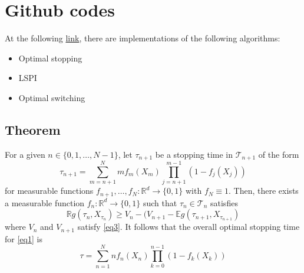 \documentclass{article}
\begin{document}
\section{Github codes}
At the following \href{https://github.com/claudia-viaro/optimal_switching}{link}, there are implementations of the following algorithms:
\begin{itemize}
    \item Optimal stopping
    \item LSPI
    \item Optimal switching
\end{itemize}


\newpage
\begin{appendices}
  \renewcommand\thetable{\thesection\arabic{table}}
  \renewcommand\thefigure{\thesection\arabic{figure}}

\section{Theorem}\label{section:appendix_d}
For a given $n \in \{ 0, 1, \ldots, N-1\}$, let $\tau_{n+1}$ be a stopping time in $\mathcal{T}_{n+1}$ of the form
\begin{equation}\label{theo}
    \tau_{n+1} = \sum_{m=n+1}^N m f_m(X_m) \prod_{j=n+1}^{m-1} (1-f_j(X_j))
\end{equation}
for measurable functions $f_{n+1}, \ldots, f_N : \mathbb{R}^d \rightarrow \{0,1\}$ with $f_N \equiv 1$. Then, there exists a measurable function $f_n: \mathbb{R}^d \rightarrow \{0,1\}$ such that $\tau_n \in \mathcal{T}_n$ satisfies 
\begin{equation}\label{eq13}
    \mathbb{R}g(\tau_n, X_{\tau_n}) \geq V_n - (V_{n+1}-\mathbb{E}g(\tau_{n+1}, X_{\tau_{n+1}})
\end{equation}
where $V_n$ and $V_{n+1}$ satisfy \ref{eq3}.
It follows that the overall optimal stopping time for \ref{eq1} is 
\begin{equation}\label{eq14}
    \tau = \sum_{n=1}^N n f_n(X_n) \prod_{k=0}^{n-1} (1-f_k(X_k))
\end{equation}





\end{appendices}



\newpage


\end{document}
